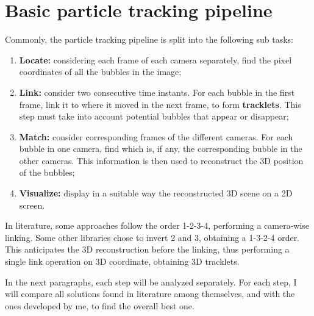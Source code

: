 \chapter{Basic particle tracking pipeline}
\label{chap:basicpipeline}

Commonly, the particle tracking pipeline is split into the following sub tasks:
\begin{enumerate}
	\itemsep 0em
	\item \textbf{Locate:} considering each frame of each camera separately, find the pixel coordinates of all the bubbles in the image;
	\item \textbf{Link:} consider two consecutive time instants. For each bubble in the first frame, link it to where it moved in the next frame, to form \textbf{tracklets}. This step must take into account potential bubbles that appear or disappear;
	\item \textbf{Match:} consider corresponding frames of the different cameras. For each bubble in one camera, find which is, if any, the corresponding bubble in the other cameras. This information is then used to reconstruct the 3D position of the bubbles;
	\item \textbf{Visualize:} display in a suitable way the reconstructed 3D scene on a 2D screen.
\end{enumerate}
In literature, some approaches follow the order 1-2-3-4, performing a camera-wise linking.
Some other libraries chose to invert 2 and 3, obtaining a 1-3-2-4 order.
This anticipates the 3D reconstruction before the linking, thus performing a single link operation on 3D coordinate, obtaining 3D tracklets.

In the next paragraphs, each step will be analyzed separately.
For each step, I will compare all solutions found in literature among themselves, and with the ones developed by me, to find the overall best one.
